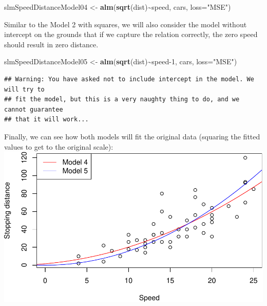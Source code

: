 \documentclass[
]{book}
\newenvironment{Shaded}{\begin{snugshade}}{\end{snugshade}}
\newcommand{\AttributeTok}[1]{\textcolor[rgb]{0.13,0.29,0.53}{#1}}
\newcommand{\DecValTok}[1]{\textcolor[rgb]{0.00,0.00,0.81}{#1}}
\newcommand{\FunctionTok}[1]{\textcolor[rgb]{0.13,0.29,0.53}{\textbf{#1}}}
\newcommand{\NormalTok}[1]{#1}
\newcommand{\OtherTok}[1]{\textcolor[rgb]{0.56,0.35,0.01}{#1}}
\newcommand{\SpecialCharTok}[1]{\textcolor[rgb]{0.81,0.36,0.00}{\textbf{#1}}}
\newcommand{\StringTok}[1]{\textcolor[rgb]{0.31,0.60,0.02}{#1}}
\theoremstyle{definition}
\theoremstyle{definition}
\theoremstyle{definition}
\theoremstyle{definition}
\theoremstyle{remark}
\begin{document}
\begin{Shaded}
\begin{Highlighting}[]
\NormalTok{slmSpeedDistanceModel04 }\OtherTok{\textless{}{-}} \FunctionTok{alm}\NormalTok{(}\FunctionTok{sqrt}\NormalTok{(dist)}\SpecialCharTok{\textasciitilde{}}\NormalTok{speed, cars, }\AttributeTok{loss=}\StringTok{"MSE"}\NormalTok{)}
\end{Highlighting}
\end{Shaded}

Similar to the Model 2 with squares, we will also consider the model without intercept on the grounds that if we capture the relation correctly, the zero speed should result in zero distance.

\begin{Shaded}
\begin{Highlighting}[]
\NormalTok{slmSpeedDistanceModel05 }\OtherTok{\textless{}{-}} \FunctionTok{alm}\NormalTok{(}\FunctionTok{sqrt}\NormalTok{(dist)}\SpecialCharTok{\textasciitilde{}}\NormalTok{speed}\DecValTok{{-}1}\NormalTok{, cars, }\AttributeTok{loss=}\StringTok{"MSE"}\NormalTok{)}
\end{Highlighting}
\end{Shaded}

\begin{verbatim}
## Warning: You have asked not to include intercept in the model. We will try to
## fit the model, but this is a very naughty thing to do, and we cannot guarantee
## that it will work...
\end{verbatim}

Finally, we can see how both models will fit the original data (squaring the fitted values to get to the original scale):
\includegraphics{Svetunkov---Statistics-for-Business-Analytics_files/figure-latex/speedDistanceSqrt02-1.pdf}
\end{document}
